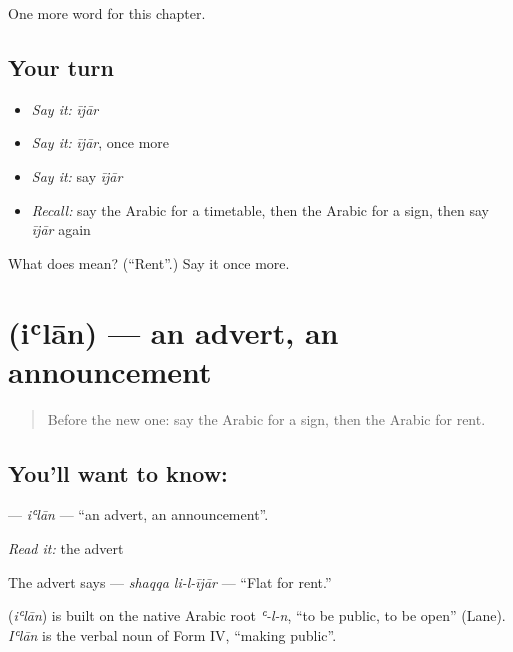 \begin{grammarlens}[title={What you've built}]
One more word for this chapter.
\end{grammarlens}

\subsection*{Your turn}
\begin{itemize}
\raggedright
  \item \emph{Say it:} \emph{ījār}
  \item \emph{Say it:} \emph{ījār}, once more
  \item \emph{Say it:} say \emph{ījār}
  \item \emph{Recall:} say the Arabic for a timetable, then the Arabic for a sign, then say \emph{ījār} again
\end{itemize}

\begin{tcolorbox}[breakable,colback=teal!4,colframe=teal!35!black,title={Before you move on}]
What does  mean? (\textquotedblleft{}Rent\textquotedblright{}.) Say it once more.
\end{tcolorbox}
\section[\texorpdfstring{\ar{إعلان} (iʿlān)}{إعلان (iʿlān)}]{ (iʿlān) — an advert, an announcement}

\label{lesson:AR-C158-ilan}



\begin{quote}
Before the new one: say the Arabic for a sign, then the Arabic for rent.
\end{quote}

\subsection*{You'll want to know: }
\textbf{} — \emph{iʿlān} — \textquotedblleft{}an advert, an announcement\textquotedblright{}.

\emph{Read it:} the advert

The advert says \textbf{ } — \emph{shaqqa li-l-ījār} — \textquotedblleft{}Flat for rent.\textquotedblright{}

\begin{cousinweb}
\textbf{} (\emph{iʿlān}) is built on the native Arabic root \emph{ʿ-l-n}, \textquotedblleft{}to be public, to be open\textquotedblright{} (Lane). \emph{Iʿlān} is the verbal noun of Form IV, \textquotedblleft{}making public\textquotedblright{}.
\end{cousinweb}

